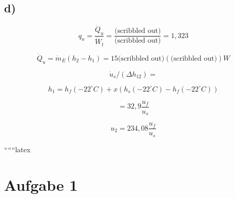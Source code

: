 

\subsection*{d)}

\[
q_{u} = \frac{\dot{Q}_{u}}{\dot{W}_{t}} = \frac{\text{(scribbled out)}}{\text{(scribbled out)}} = 1,323
\]

\[
\dot{Q}_{u} = \dot{m}_{E} (h_{2} - h_{1}) = 15 \text{(scribbled out)} \left( \text{(scribbled out)} \right) W
\]

\[
\dot{u}_{s} / \left( \Delta h_{12} \right) =
\]

\[
h_{1} = h_{f}(-22^{\circ}C) + x \left( h_{s}(-22^{\circ}C) - h_{f}(-22^{\circ}C) \right)
\]

\[
= 32,9 \frac{u_{f}}{u_{s}}
\]

\[
u_{2} = 234,08 \frac{u_{f}}{u_{s}}
\]

``````latex


\section*{Aufgabe 1}